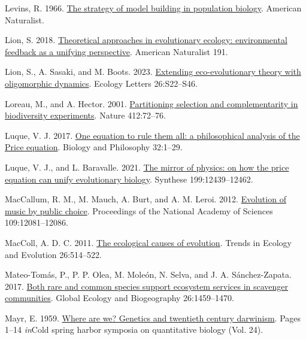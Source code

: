 \documentclass[
]{article}
\newlength{\cslhangindent}
\newenvironment{CSLReferences}[2] %
 {\begin{list}{}{%
  \setlength{\itemindent}{0pt}
  \setlength{\leftmargin}{0pt}
  \setlength{\parsep}{0pt}
  \ifodd #1
   \setlength{\leftmargin}{\cslhangindent}
   \setlength{\itemindent}{-1\cslhangindent}
  \fi
  \setlength{\itemsep}{#2\baselineskip}}}
 {\end{list}}
\begin{document}
\begin{CSLReferences}{0}{0}
Levins, R. 1966. \href{https://doi.org/10.2307/27836590}{The strategy of
model building in population biology}. American Naturalist.

Lion, S. 2018. \href{https://doi.org/10.1086/694865}{{Theoretical
approaches in evolutionary ecology: environmental feedback as a unifying
perspective}}. American Naturalist 191.

Lion, S., A. Sasaki, and M. Boots. 2023.
\href{https://doi.org/10.1111/ele.14183}{Extending eco-evolutionary
theory with oligomorphic dynamics}. Ecology Letters 26:S22--S46.

Loreau, M., and A. Hector. 2001.
\href{https://doi.org/10.1038/35083573}{{Partitioning selection and
complementarity in biodiversity experiments}}. Nature 412:72--76.

Luque, V. J. 2017. \href{https://doi.org/10.1007/s10539-016-9538-y}{{One
equation to rule them all: a philosophical analysis of the Price
equation}}. Biology and Philosophy 32:1--29.

Luque, V. J., and L. Baravalle. 2021.
\href{https://doi.org/10.1007/s11229-021-03339-6}{{The mirror of
physics: on how the price equation can unify evolutionary biology}}.
Synthese 199:12439--12462.

MacCallum, R. M., M. Mauch, A. Burt, and A. M. Leroi. 2012.
\href{https://doi.org/10.5061/dryad.h0228}{{Evolution of music by public
choice}}. Proceedings of the National Academy of Sciences
109:12081--12086.

MacColl, A. D. C. 2011.
\href{https://doi.org/10.1016/j.tree.2011.06.009}{{The ecological causes
of evolution}}. Trends in Ecology and Evolution 26:514--522.

Mateo-Tomás, P., P. P. Olea, M. Moleón, N. Selva, and J. A.
Sánchez-Zapata. 2017. \href{https://doi.org/10.1111/geb.12673}{{Both
rare and common species support ecosystem services in scavenger
communities}}. Global Ecology and Biogeography 26:1459--1470.

Mayr, E. 1959. \href{https://doi.org/10.1101/SQB.1959.024.01.003}{Where
are we? Genetics and twentieth century darwinism}. Pages 1--14
\emph{in}Cold spring harbor symposia on quantitative biology (Vol. 24).


\end{CSLReferences}
\end{document}
